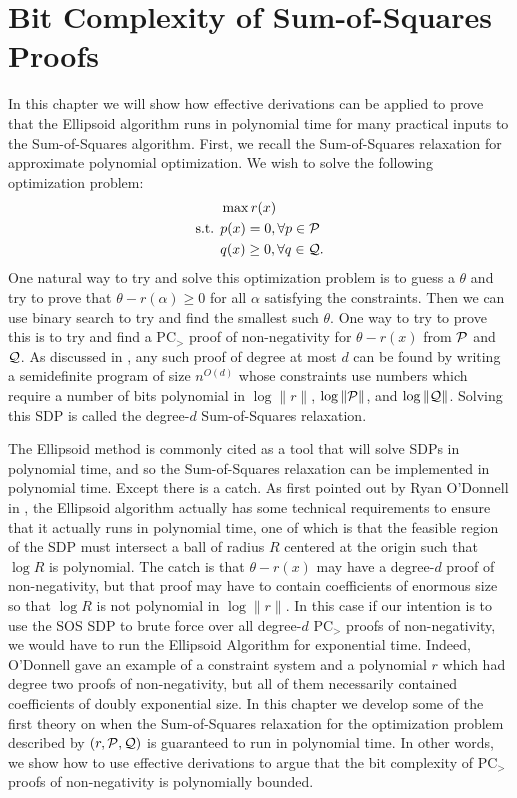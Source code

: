 \chapter{Bit Complexity of Sum-of-Squares Proofs}\label{cha:bit_complexity}
In this chapter we will show how effective derivations can be applied to prove that the Ellipsoid algorithm runs in polynomial time for many practical inputs to the Sum-of-Squares algorithm. First, we recall the Sum-of-Squares relaxation for approximate polynomial optimization. We wish to solve the following optimization problem:
\begin{align*}
&\max r(x)\\
\text{s.t. } &p(x) = 0, \forall p \in \mathcal P \\
&q(x) \geq 0, \forall q \in \mathcal Q.
\end{align*}
One natural way to try and solve this optimization problem is to guess a $\theta$ and try to prove that $\theta - r(\alpha) \geq 0$ for all $\alpha$ satisfying the constraints. Then we can use binary search to try and find the smallest such $\theta$. One way to try to prove this is to try and find a PC$_>$ proof of non-negativity for $\theta - r(x)$ from $\mathcal P$ and $\mathcal Q$. As discussed in , any such proof of degree at most $d$ can be found by writing a semidefinite program of size $n^{O(d)}$ whose constraints use numbers which require a number of bits polynomial in $\log \|r\|$, $\log \|\mathcal P\|$, and $\log \|\mathcal Q\|$. Solving this SDP is called the degree-$d$ Sum-of-Squares relaxation. 

The Ellipsoid method is commonly cited as a tool that will solve SDPs in polynomial time, and so the Sum-of-Squares relaxation can be implemented in polynomial time. Except there is a catch. As first pointed out by Ryan O'Donnell in \cite{ODon16}, the Ellipsoid algorithm actually has some technical requirements to ensure that it actually runs in polynomial time, one of which is that the feasible region of the SDP must intersect a ball of radius $R$ centered at the origin such that $\log R$ is polynomial. The catch is that $\theta - r(x)$ may have a degree-$d$ proof of non-negativity, but that proof may have to contain coefficients of enormous size so that $\log R$ is not polynomial in $\log \|r\|$. In this case if our intention is to use the SOS SDP to brute force over all degree-$d$ PC$_>$ proofs of non-negativity, we would have to run the Ellipsoid Algorithm for exponential time. Indeed, O'Donnell gave an example of a constraint system and a polynomial $r$ which had degree two proofs of non-negativity, but all of them necessarily contained coefficients of doubly exponential size. In this chapter we develop some of the first theory on when the Sum-of-Squares relaxation for the optimization problem described by $(r, \mathcal P,\mathcal Q)$ is guaranteed to run in polynomial time. In other words, we show how to use effective derivations to argue that the bit complexity of PC$_>$ proofs of non-negativity is polynomially bounded. 

